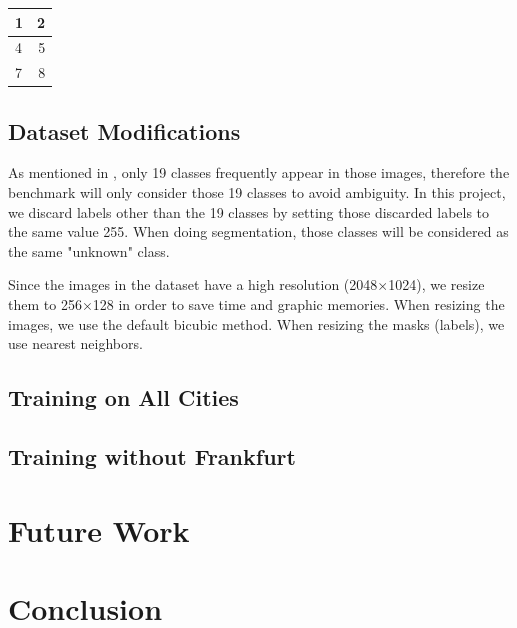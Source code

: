 \documentclass[10pt,twocolumn,letterpaper]{article}
\begin{document}
\begin{center}
	\begin{tabular}{ | l | r | }
		\hline
		1 & 2\\ \hline \hline
		4 & 5\\ \hline
		7 & 8\\
		\hline
	\end{tabular}
\end{center}

\subsection{Dataset Modifications}
As mentioned in \cite{Cordts2016Cityscapes}, only 19 classes frequently appear in those images, therefore the benchmark will only consider those 19 classes to avoid ambiguity. In this project, we discard labels other than the 19 classes by setting those discarded labels to the same value 255. When doing segmentation, those classes will be considered as the same "unknown" class.

Since the images in the dataset have a high resolution (2048$\times$1024), we resize them to 256$\times$128 in order to save time and graphic memories. When resizing the images, we use the default bicubic method. When resizing the masks (labels), we use nearest neighbors.

\subsection{Training on All Cities}

\subsection{Training without Frankfurt}

\section{Future Work}

\section{Conclusion}
\end{document}

